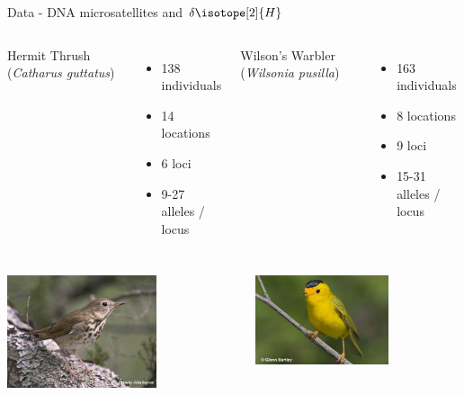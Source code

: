 \documentclass[11pt,ignorenonframetext,]{beamer}
\begin{document}
\begin{frame}{Data - DNA microsatellites and \(\delta \isotope[2]{H}\)}

\begin{columns}[t]
Hermit Thrush (\textit{Catharus guttatus}) \\
\vspace{2mm}
\begin{itemize}
\item 138 individuals
\item 14 locations
\item 6 loci
\item 9-27 alleles / locus
\end{itemize}
Wilson's Warbler (\textit{Wilsonia pusilla}) \\
\vspace{2mm}
\begin{itemize}
\item 163 individuals
\item 8 locations
\item 9 loci
\item 15-31 alleles / locus
\end{itemize}

\end{columns}

\vspace{5mm}

\begin{columns}[t]
\begin{center}
\includegraphics[width=0.65\textwidth]{figs/hermit_thrush.jpeg}
\end{center}
\begin{center}
\includegraphics[width=0.65\textwidth]{figs/wilsons_warbler.jpeg}
\end{center}
\end{columns}

\end{frame}
\end{document}
